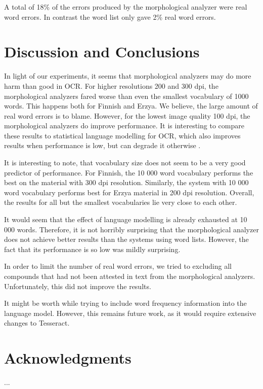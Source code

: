 \documentclass[b5paper]{article}
\begin{document}
A total of 18\% of the errors produced by the morphological analyzer
were real word errors. In contrast the word list only gave 2\% real
word errors.

\section{Discussion and Conclusions}
\label{disc}

In light of our experiments, it seems that morphological analyzers may
do more harm than good in OCR. For higher resolutions 200 and 300 dpi,
the morphological analyzers fared worse than even the smallest
vocabulary of 1000 words. This happens both for Finnish and Erzya. We
believe, the large amount of real word errors is to blame. However,
for the lowest image quality 100 dpi, the morphological analyzers do
improve performance. It is interesting to compare these results to
statistical language modelling for OCR, which also improves results
when performance is low, but can degrade it otherwise \cite{smith11}.

It is interesting to note, that vocabulary size does not seem to be a
very good predictor of performance. For Finnish, the 10 000 word
vocabulary performs the best on the material with 300 dpi
resolution. Similarly, the system with 10 000 word vocabulary performs
best for Erzya material in 200 dpi resolution. Overall, the results
for all but the smallest vocabularies lie very close to each other.

It would seem that the effect of language modelling is already
exhausted at 10 000 words. Therefore, it is not horribly surprising
that the morphological analyzer does not achieve better results than
the systems using word lists. However, the fact that its performance
is so low was mildly surprising.

In order to limit the number of real word errors, we tried to
excluding all compounds that had not been attested in text from the
morphological analyzers. Unfortunately, this did not improve the
results.

It might be worth while trying to include word frequency information into
the language model. However, this remains future work, as it would
require extensive changes to Tesseract.

\section*{Acknowledgments}

...



\end{document}

